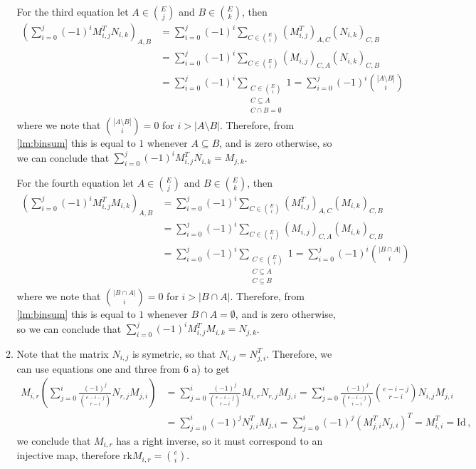 \documentclass[kulak]{tplt}
\theoremstyle{definition}
\newcommand{\rk}{\mathrm{rk}}
\newcommand{\Id}{\mathrm{Id}}
\begin{document}
\begin{enumerate}
\begin{enumerate}
For the third equation let $A \in \binom{E}{j}$ and $B \in \binom{E}{k}$, then
\begin{align*}
\left(\sum_{i=0}^j (-1)^i M_{i, j}^T N_{i, k}\right)_{A, B} &= \sum_{i=0}^j (-1)^i \sum_{C \in \binom{E}{i}} (M_{i, j}^T)_{A, C}( N_{i, k})_{C, B}\\
&=\sum_{i=0}^j (-1)^i \sum_{C \in \binom{E}{i}} (M_{i, j})_{C, A}( N_{i, k})_{C, B}\\
&=\sum_{i=0}^j (-1)^i \sum_{\substack{C \in \binom{E}{i}\\ C \subseteq A \\ C \cap B = \emptyset  }} 1 =\sum_{i=0}^j (-1)^i \binom{|A \setminus B|}{i}
\end{align*}
where we note that $\binom{|A \setminus B|}{i} = 0 $ for $i > |A \setminus B|$.
Therefore, from \cref{lm:binsum} this is equal to $1$ whenever $A \subseteq B $, and is zero otherwise, so we can conclude that
$\sum_{i=0}^j (-1)^i M_{i, j}^T N_{i, k} = M_{j, k}$.


For the fourth equation let $A \in \binom{E}{j}$ and $B \in \binom{E}{k}$, then
\begin{align*}
\left(\sum_{i=0}^j (-1)^i M_{i, j}^T M_{i, k}\right)_{A, B} &= \sum_{i=0}^j (-1)^i \sum_{C \in \binom{E}{i}} (M_{i, j}^T)_{A, C}( M_{i, k})_{C, B}\\
&=\sum_{i=0}^j (-1)^i \sum_{C \in \binom{E}{i}} (M_{i, j})_{C, A}( M_{i, k})_{C, B}\\
&=\sum_{i=0}^j (-1)^i \sum_{\substack{C \in \binom{E}{i}\\ C \subseteq A \\ C\subseteq B}} 1 =\sum_{i=0}^j (-1)^i \binom{|B \cap A|}{i}
\end{align*}
where we note that $\binom{|B \cap A|}{i} = 0 $ for $i > |B \cap A|$.
Therefore, from \cref{lm:binsum} this is equal to $1$ whenever $B \cap A = \emptyset $, and is zero otherwise, so we can conclude that
$\sum_{i=0}^j (-1)^i  M_{i, j}^T M_{i, k} = N_{j, k}$.




\item 
Note that the matrix $N_{i, j}$ is symetric, so that $N_{i, j} = N_{j, i}^T$.
Therefore, we can use equations one and three from 6 a) to get
\begin{align*}
M_{i, r} \left( \sum_{j=0}^i \frac{(-1)^j}{\binom{e-i-j}{r-i}} N_{r, j} M_{j, i}\right) &= \sum_{j=0}^i \frac{(-1)^j}{\binom{e-i-j}{r-i}}M_{i, r} N_{r, j} M_{j, i} = \sum_{j=0}^i \frac{(-1)^j}{\binom{e-i-j}{r-i}}\binom{e-i-j}{r-i} N_{i, j} M_{j, i}\\
&= \sum_{j=0}^i (-1)^j N_{j, i}^T M_{j, i} = \sum_{j=0}^i (-1)^j \left(M_{j, i}^T N_{j, i} \right)^T = M_{i, i}^T = \Id \, ,
\end{align*}
we conclude that $M_{i, r}$ has a right inverse, so it must correspond to an injective map, therefore $\rk M_{i, r} = \binom{e}{i}$.


\end{enumerate}
\end{enumerate}
\end{document}
